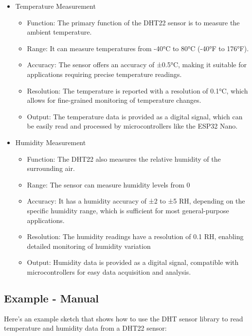 \begin{itemize}
	\item Temperature Measurement
	\begin{itemize}
		\item Function: The primary function of the DHT22 sensor is to measure the ambient temperature.
		\item Range: It can measure temperatures from -40°C to 80°C (-40°F to 176°F).
		\item Accuracy: The sensor offers an accuracy of ±0.5°C, making it suitable for applications requiring precise temperature readings.
		\item Resolution: The temperature is reported with a resolution of 0.1°C, which allows for fine-grained monitoring of temperature changes.
		\item Output: The temperature data is provided as a digital signal, which can be easily read and processed by microcontrollers like the ESP32 Nano.
	\end{itemize}
	\item Humidity Measurement
	\begin{itemize}
		\item Function: The DHT22 also measures the relative humidity of the surrounding air.
		\item Range: The sensor can measure humidity levels from 0%
		\item Accuracy: It has a humidity accuracy of ±2 to ±5 RH, depending on the specific humidity range, which is sufficient for most general-purpose applications.
		
		\item Resolution: The humidity readings have a resolution of 0.1 RH, enabling detailed monitoring of humidity variation
		\item Output: Humidity data is provided as a digital signal, compatible with microcontrollers for easy data acquisition and analysis.

	\end{itemize}
\end{itemize}


\subsection{Example - Manual}

Here’s an example sketch that shows how to use the DHT sensor library to read temperature and humidity data from a DHT22 sensor:


